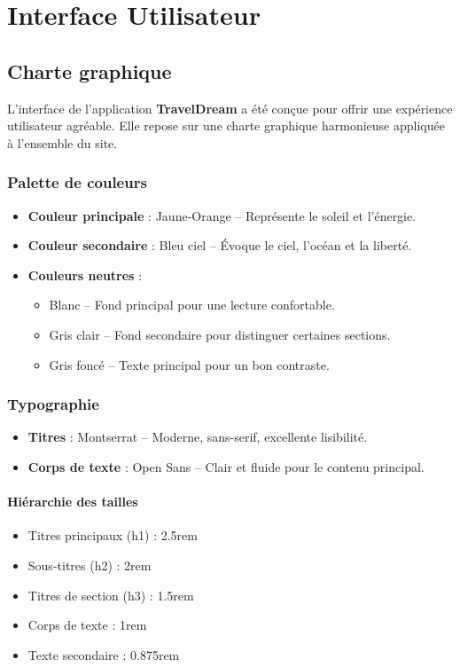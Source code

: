 \documentclass[a4paper,12pt]{article}
\begin{document}
\section{Interface Utilisateur}

\subsection{Charte graphique}
L’interface de l’application \textbf{TravelDream} a été conçue pour offrir une expérience utilisateur agréable. Elle repose sur une charte graphique harmonieuse appliquée à l’ensemble du site.

\subsubsection{Palette de couleurs}
\begin{itemize}
\item \textbf{Couleur principale} : Jaune-Orange – Représente le soleil et l’énergie.
  \item \textbf{Couleur secondaire} : Bleu ciel – Évoque le ciel, l’océan et la liberté.
  \item \textbf{Couleurs neutres} :
  \begin{itemize}
    \item Blanc – Fond principal pour une lecture confortable.
    \item Gris clair – Fond secondaire pour distinguer certaines sections.
    \item Gris foncé – Texte principal pour un bon contraste.
  \end{itemize}
\end{itemize}

\subsubsection{Typographie}
\begin{itemize}
  \item \textbf{Titres} : Montserrat – Moderne, sans-serif, excellente lisibilité.
  \item \textbf{Corps de texte} : Open Sans – Clair et fluide pour le contenu principal.
\end{itemize}

\paragraph{Hiérarchie des tailles}
\begin{itemize}
  \item Titres principaux (h1) : 2.5rem
  \item Sous-titres (h2) : 2rem
  \item Titres de section (h3) : 1.5rem
  \item Corps de texte : 1rem
  \item Texte secondaire : 0.875rem
\end{itemize}
\end{document}
